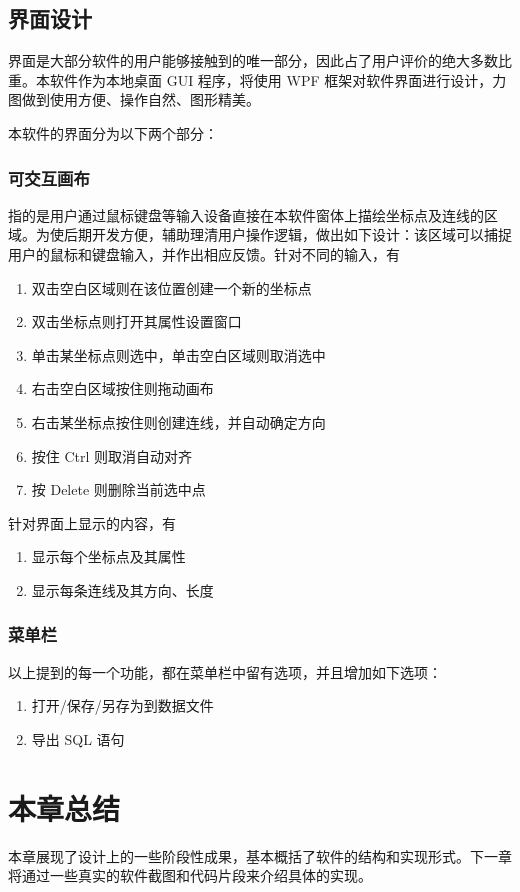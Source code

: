 \subsection{界面设计}

界面是大部分软件的用户能够接触到的唯一部分，因此占了用户评价的绝大多数比重。本软件作为本地桌面 GUI 程序，将使用 WPF 框架对软件界面进行设计，力图做到使用方便、操作自然、图形精美。

本软件的界面分为以下两个部分：

\subsubsection{可交互画布}

指的是用户通过鼠标键盘等输入设备直接在本软件窗体上描绘坐标点及连线的区域。为使后期开发方便，辅助理清用户操作逻辑，做出如下设计：该区域可以捕捉用户的鼠标和键盘输入，并作出相应反馈。针对不同的输入，有

\begin{enumerate}
  \item 双击空白区域则在该位置创建一个新的坐标点
  \item 双击坐标点则打开其属性设置窗口
  \item 单击某坐标点则选中，单击空白区域则取消选中
  \item 右击空白区域按住则拖动画布
  \item 右击某坐标点按住则创建连线，并自动确定方向
  \item 按住 Ctrl 则取消自动对齐
  \item 按 Delete 则删除当前选中点
\end{enumerate}

针对界面上显示的内容，有

\begin{enumerate}
  \item 显示每个坐标点及其属性
  \item 显示每条连线及其方向、长度
\end{enumerate}

\subsubsection{菜单栏}

以上提到的每一个功能，都在菜单栏中留有选项，并且增加如下选项：

\begin{enumerate}
  \item 打开/保存/另存为到数据文件
  \item 导出 SQL 语句
\end{enumerate}

\section{本章总结}

本章展现了设计上的一些阶段性成果，基本概括了软件的结构和实现形式。下一章将通过一些真实的软件截图和代码片段来介绍具体的实现。

